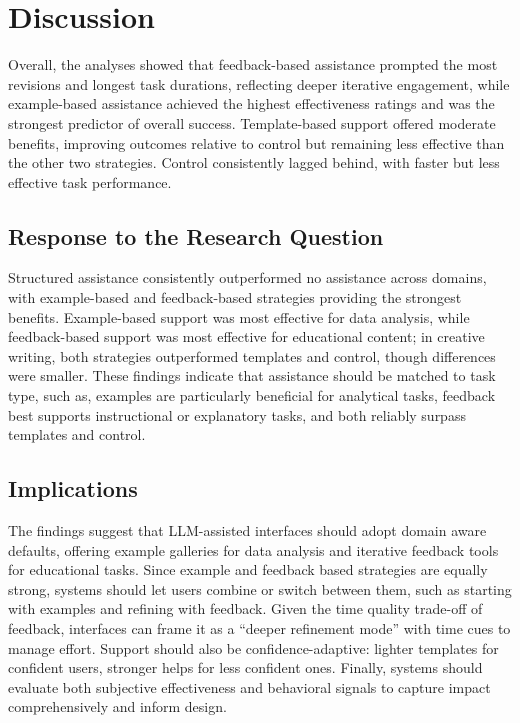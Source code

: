 \section{\textbf{Discussion}}

Overall, the analyses showed that feedback-based assistance prompted the most revisions and longest task durations, reflecting deeper iterative engagement, while example-based assistance achieved the highest effectiveness ratings and was the strongest predictor of overall success. Template-based support offered moderate benefits, improving outcomes relative to control but remaining less effective than the other two strategies. Control consistently lagged behind, with faster but less effective task performance.

\subsection {\textbf {Response to the Research Question}}
Structured assistance consistently outperformed no assistance across domains, with example-based and feedback-based strategies providing the strongest benefits. Example-based support was most effective for data analysis, while feedback-based support was most effective for educational content; in creative writing, both strategies outperformed templates and control, though differences were smaller. These findings indicate that assistance should be matched to task type, such as, examples are particularly beneficial for analytical tasks, feedback best supports instructional or explanatory tasks, and both reliably surpass templates and control.

\subsection {\textbf {Implications}}
The findings suggest that LLM-assisted interfaces should adopt domain aware defaults, offering example galleries for data analysis and iterative feedback tools for educational tasks. Since example and feedback based strategies are equally strong, systems should let users combine or switch between them, such as starting with examples and refining with feedback. Given the time quality trade-off of feedback, interfaces can frame it as a “deeper refinement mode” with time cues to manage effort. Support should also be confidence-adaptive: lighter templates for confident users, stronger helps for less confident ones. Finally, systems should evaluate both subjective effectiveness and behavioral signals to capture impact comprehensively and inform design.

